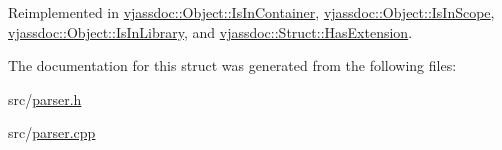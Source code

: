 Reimplemented in \hyperlink{structvjassdoc_1_1Object_1_1IsInContainer_390275d3950a824ad1a9ac025964ef64}{vjassdoc::Object::IsInContainer}, \hyperlink{structvjassdoc_1_1Object_1_1IsInScope_319d4736b3b35681570cc5be477dc5c9}{vjassdoc::Object::IsInScope}, \hyperlink{structvjassdoc_1_1Object_1_1IsInLibrary_a1a041f942f665e8f62e30fa2ad3b260}{vjassdoc::Object::IsInLibrary}, and \hyperlink{structvjassdoc_1_1Struct_1_1HasExtension_9e08804f805e2ba8616088ec0bfe84e2}{vjassdoc::Struct::HasExtension}.

The documentation for this struct was generated from the following files:\begin{CompactItemize}
\item 
src/\hyperlink{parser_8h}{parser.h}\item 
src/\hyperlink{parser_8cpp}{parser.cpp}\end{CompactItemize}
